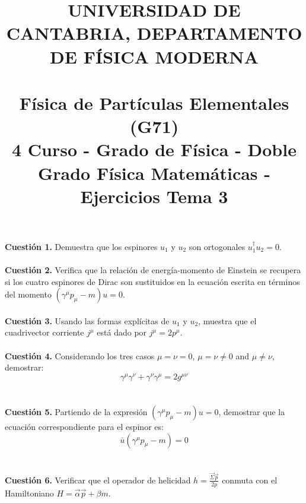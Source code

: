 \documentclass[paper=a4, fontsize=11pt]{scrartcl} %
\date{}
\title{	
\normalfont \normalsize 
\textsc{UNIVERSIDAD DE CANTABRIA, DEPARTAMENTO DE FÍSICA MODERNA} \\ [20pt] %
\horrule{0.5pt} \\[0.4cm] %
\huge Física de Partículas Elementales (G71) \\ %
\normalsize 4 Curso - Grado de Física - Doble Grado Física Matemáticas - Ejercicios Tema 3
\horrule{2pt} \\[0.5cm] %
}
\numberwithin{equation}{section} %
\numberwithin{figure}{section} %
\numberwithin{table}{section} %
\begin{document}
\maketitle %

\vspace{-2.5cm}

\textbf{Cuestión 1.} Demuestra que los espinores $u_1$ y $u_2$ son ortogonales $u_1^\dagger u_2=0$.
\\
\\
\textbf{Cuestión 2.} Verifica que la relación de energía-momento de Einstein se recupera si los cuatro espinores de Dirac son sustituidos en la ecuación escrita
en términos del momento $(\gamma^\mu p_\mu -m)u=0$. 
\\
\\
\textbf{Cuestión 3.} Usando las formas explícitas de $u_1$ y $u_2$, muestra que el cuadrivector corriente $j^\mu$ está dado por $j^\mu=2p^\mu$.
\\
\\
\textbf{Cuestión 4.} Considerando los tres casos $\mu=\nu=0$, $\mu=\nu\neq 0$ and $\mu\neq\nu$, demostrar:
\begin{equation*}
\gamma^\mu\gamma^\nu + \gamma^\nu\gamma^\mu = 2 g^{\mu\nu}
\end{equation*}
\\
\\
\textbf{Cuestión 5.} Partiendo de la expresión $(\gamma^\mu p_\mu -m)u=0$, demostrar que la ecuación correspondiente para el espinor es:
\begin{equation*}
\bar{u}(\gamma^\mu p_\mu -m)=0 
\end{equation*}
\\
\\
\textbf{Cuestión 6.} Verificar que el operador de helicidad $h=\frac{\vec{\Sigma}\vec{p}}{2p}$ conmuta con el Hamiltoniano $H=\vec{\alpha}\vec{p}+\beta m$.
\end{document}
